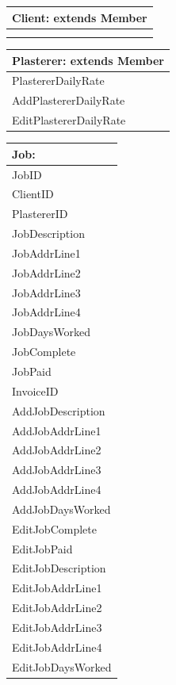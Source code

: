 \begin{tabular}{|p{5cm}|}
	\hline
	\textbf{Client:} extends \textbf{Member} \\ \hline
		 \\ \hline
		 \\ \hline
\end{tabular}


\begin{tabular}{|p{5cm}|}
	\hline
	\textbf{Plasterer:} extends \textbf{Member} \\ \hline
		PlastererDailyRate \\ \hline
		AddPlastererDailyRate \\
		EditPlastererDailyRate \\ \hline
\end{tabular}

\begin{tabular}{|p{5cm}|}
	\hline
	\textbf{Job:} \\ \hline
		JobID \\
		ClientID \\
		PlastererID \\
		JobDescription \\
		JobAddrLine1 \\
		JobAddrLine2 \\
		JobAddrLine3 \\
		JobAddrLine4 \\
		JobDaysWorked \\
		JobComplete \\
		JobPaid \\ 
		InvoiceID \\ \hline
		AddJobDescription\\
		AddJobAddrLine1 \\
		AddJobAddrLine2 \\
		AddJobAddrLine3 \\
		AddJobAddrLine4 \\
		AddJobDaysWorked \\
		EditJobComplete \\
		EditJobPaid \\
		EditJobDescription\\
		EditJobAddrLine1 \\
		EditJobAddrLine2 \\
		EditJobAddrLine3 \\
		EditJobAddrLine4 \\
		EditJobDaysWorked \\ \hline
\end{tabular}

